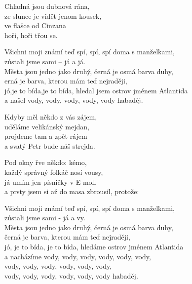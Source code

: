 
\ve{}
Chladná jsou dubnová rána,\\
ze slunce je vidět jenom kousek,\\
ve flašce od Cinzana\\
hoři, hoři třou se.

\cho{}
Všichni moji známí teď spí, spí, sp{í} doma s manželkami,\\
zůstali jsme sami – já a já.\\
Města jsou jedno jako druhý, černá je osmá barva duhy,\\
erná je barva, kterou mám teď nejraději,\\
jó,je to bída,je to bída, hledal jsem ostrov jménem Atlantida\\
a našel vody, vody, vody, vody, vody habaděj.

\ve{}
Kdyby měl někdo z vás zájem,\\
uděláme velikánský mejdan,\\
projdeme tam a zpět rájem\\
a svatý Petr bude náš strejda.

\cho{}

\ve{}
Pod okny řve někdo: kémo,\\
každý správný folkáč nosí vousy,\\
já umím jen písničky v E moll\\
a prsty jsem si až do masa zbrousil, protože:

\cho{}
Všichni moji známí teď spí, spí, spí doma s manželkami,\\
zůstali jsme sami - já a vy.\\
Města jsou jedno jako druhý, černá je osmá barva duhy,\\
černá je barva, kterou mám teď nejraději,\\
jó, je to bída, je to bída, hledáme ostrov jménem Atlantida\\
a nacházíme vody, vody, vody, vody, vody, vody,\\
vody, vody, vody, vody, vody, vody,\\
vody, vody, vody, vody, vody, vody habaděj.

\esong{}